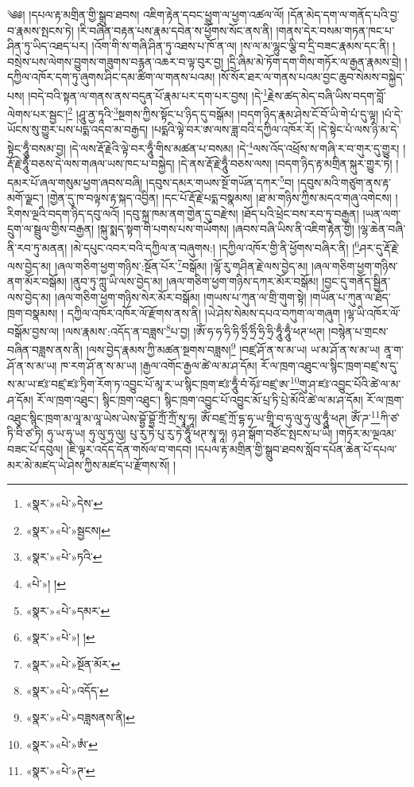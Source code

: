 ༄༅། །དཔལ་རྟ་མགྲིན་གྱི་སྒྲུབ་ཐབས། འཇིག་རྟེན་དབང་ཕྱུག་ལ་ཕྱག་འཚལ་ལོ། །དོན་མེད་དག་ལ་གནོད་པའི་བྱ་བ་རྣམས་སྤངས་ཏེ། །རི་བཞིན་བརྟན་པས་རྣམ་དབེན་ས་ཕྱོགས་སོང་ནས་ནི། །གནས་དེར་བསམ་གཏན་ཁང་པ་ཤིན་ཏུ་ཡིད་འཐད་པར། །འོག་གི་ས་གཞི་ཤིན་ཏུ་འཐས་པ་ཁོ་ན་ལ། །ས་ལ་མ་ལྷུང་ལྕི་བ་དྲི་བཟང་རྣམས་དང་ནི། །བསྲེས་པས་ལེགས་བྱུགས་གཟུགས་བརྙན་འཆར་བ་ལྟ་བུར་བྱ། །དྲི་ཞིམ་མེ་ཏོག་དག་གིས་གཏོར་ལ་རྒྱན་རྣམས་བྲེ། །དཀྱིལ་འཁོར་དག་ཏུ་ཞུགས་ཤིང་དམ་ཚིག་ལ་གནས་པའམ། །སོ་སོར་ཐར་ལ་གནས་པའམ་བྱང་ཆུབ་སེམས་བསྐྱེད་པས། །བདེ་བའི་སྟན་ལ་གནས་ནས་བདུན་པོ་རྣམ་པར་དག་པར་བྱས། །དེ་\footnote{«སྣར་»«པེ་»དེས་}རྗེས་ཚད་མེད་བཞི་ཡིས་བདག་བློ་ལེགས་པར་སྦྱང་།\footnote{«སྣར་»«པེ་»སྦྱངས།} །ཤཱུ་ནྱ་ཏཱའི་\footnote{«སྣར་»«པེ་»ཏའི་}སྔགས་ཀྱིས་སྟོང་པ་ཉིད་དུ་བསྒོམ། །བདག་ཉིད་རྣམ་ཤེས་ངོ་བོ་ཡི་གེ་པཾ་དུ་ལྟ། །པཾ་དེ་ཡོངས་སུ་གྱུར་པས་པདྨ་འདབ་མ་བརྒྱད། །པདྨའི་ལྟེ་བར་ཨ་ལས་ཟླ་བའི་དཀྱིལ་འཁོར་རོ། །དེ་སྟེང་པཾ་ལས་ཉི་མ་དེ་སྟེང་ཧཱུྃ་བསམ་བྱ། །དེ་ལས་རྡོ་རྗེའི་ལྟེ་བར་ཧཱུྃ་གིས་མཚན་པ་བསམ། །དེ་\footnote{«པེ་»། །}ལས་འོད་འཕྲོས་ས་གཞི་ར་བ་གུར་དུ་གྱུར། །རྡོ་རྗེ་ཧཱུྃ་བཅས་དེ་ལས་གཞལ་ཡས་ཁང་པ་བསྐྱེད། །དེ་ནས་རྡོ་རྗེ་ཧཱུྃ་བཅས་ལས། །བདག་ཉིད་རྟ་མགྲིན་སྐུར་གྱུར་ཏེ། །དམར་པོ་ཞལ་གསུམ་ཕྱག་ཞབས་བཞི། །དབུས་དམར་གཡས་སྔོ་གཡོན་དཀར་\footnote{«སྣར་»«པེ་»དམར་}བ། །དབུས་མའི་གཙུག་ནས་རྟ་མགོ་ལྗང་། །གྱེན་དུ་ཁ་བལྟས་རྟ་སྐད་འབྱིན། །དང་པོ་རྡོ་རྗེ་པདྨ་བསྣམས། །ཐ་མ་གཉིས་ཀྱིས་མདའ་གཞུ་འགེངས། །རིགས་ལྔའི་བདག་ཉིད་དབུ་ལའོ། །དབུ་སྐྲ་ཁམ་ནག་གྱེན་དུ་བརྫེས། །ཐོད་པའི་ཕྲེང་བས་རབ་ཏུ་བརྒྱན། །ཡན་ལག་དྲུག་ལ་སྦྲུལ་གྱིས་བརྒྱན། །སྐུ་སྨད་སྟག་གི་པགས་པས་གཡོགས། །ཞབས་བཞི་ཡིས་ནི་འཇིག་རྟེན་གྱི། །ལྷ་ཆེན་བཞི་ནི་རབ་ཏུ་མནན། །མེ་དཔུང་འབར་བའི་དཀྱིལ་ན་བཞུགས:། །དཀྱིལ་འཁོར་གྱི་ནི་ཕྱོགས་བཞིར་ནི། །\footnote{«སྣར་»«པེ་»། །}ཤར་དུ་རྡོ་རྗེ་ལས་བྱེད་མ། །ཞལ་གཅིག་ཕྱག་གཉིས་:སྔོན་པོར་\footnote{«སྣར་»«པེ་»སྔོན་མོར་}བསྒོམ། །ལྷོ་རུ་གཤིན་རྗེ་ལས་བྱེད་མ། །ཞལ་གཅིག་ཕྱག་གཉིས་ནག་མོར་བསྒོམ། །ནུབ་ཏུ་ཀླུ་ཡི་ལས་བྱེད་མ། །ཞལ་གཅིག་ཕྱག་གཉིས་དཀར་མོར་བསྒོམ། །བྱང་དུ་གནོད་སྦྱིན་ལས་བྱེད་མ། །ཞལ་གཅིག་ཕྱག་གཉིས་སེར་མོར་བསྒོམ། །གཡས་པ་ཀུན་ལ་གྲི་གུག་སྟེ། །གཡོན་པ་ཀུན་ལ་ཐོད་ཁྲག་བསྣམས། །
དཀྱིལ་འཁོར་འཁོར་ལོ་རྫོགས་ནས་ནི། །ཡེ་ཤེས་སེམས་དཔའ་བཀུག་ལ་གཞུག །ལྷ་ཡི་འཁོར་ལོ་བསྒོམ་བྱས་ལ། །ལས་རྣམས་:འདོད་ན་བཟླས་\footnote{«སྣར་»«པེ་»འདོད་}པ་བྱ། །ཨོཾ་ཧ་ཧ་ཧི་ཧི་ཧྲིཾ་ཧྲིཾ་ཧྲི་ཧྲི་ཧཱུྃ་ཧཱུྃ་ཕཊ་ཕཊ། །བསྙེན་པ་གྲངས་བཞིན་བཟླས་ནས་ནི། །ལས་བྱེད་རྣམས་ཀྱི་མཚན་སྔགས་བཟླས།\footnote{«སྣར་»«པེ་»བཟླསནས་ནི།} །བཛྲ་ཤོ་ན་ས་མ་ཡ། ཡ་མ་ཤོ་ན་ས་མ་ཡ། ནཱ་ག་ཤོ་ན་ས་མ་ཡ། ཁ་རག་ཤོ་ན་ས་མ་ཡ། །རྒྱལ་འགོང་རྒྱལ་ཚེ་ལ་མ་ཤ་དོམ། རོ་ལ་ཁྲག་འཐུང་ལ་སྙིང་ཁྲག་བཛྲ་ས་དུ་ས་མ་ཡ་ཛཿ་བཛྲ་ཛཿ་ཏྲིག་རོག་ཏ་འབྱུང་པོ་མཱ་ར་ཡ་སྙིང་ཁྲག་ཛཿ་ཧཱུྃ་བཾ་ཧོཿ་བཛྲ་ཨ་\footnote{«སྣར་»«པེ་»ཨཾ་}གུ་ཤ་ཛཿ་འབྱུང་པོའི་ཚེ་ལ་མ་ཤ་དོམ། རོ་ལ་ཁྲག་འཐུང་། སྙིང་ཁྲག་འཐུང་། སྙིང་ཁྲག་འབྱུང་པོ་འབྱུང་མོ་པྲ་ཏི་པྲེ་མོའི་ཚེ་ལ་མ་ཤ་དོམ། རོ་ལ་ཁྲག་འཐུང་སྙིང་ཁྲག་མ་ལཱ་མ་ལཱ་ཡེས་ཡེས་བྷྱོ་བྷྱོ་ཀྲོཾ་ཀྲོཾ་སྭཱ་ཧཱ། ཨོཾ་བཛྲ་ཀྲོ་དྷ་ཧ་ཡ་གྲཱི་བ་ཧུ་ལུ་ཧུ་ལུ་ཧཱུྃ་ཕཊ། ཨོཾ་ཌ་\footnote{«སྣར་»«པེ་»ཊ་}ཀི་ཙ་ཏི་བི་ཙ་ཏི། ཧུ་ཡ་ཧུ་ཡ། ཧུ་ལུ་ཧུ་ལུ། པུ་རུ་ཏེ་པུ་རུ་ཏེ་ཧཱུྃ་ཕཊ་སྭཱ་ཧཱ། ཉ་ཤ་སྒོག་བཙོང་སྤངས་པ་ཡི། །གཏོར་མ་ལྔའམ་བཟང་པོ་དབུལ། །ཇི་ལྟར་འདོད་དོན་གསོལ་བ་གདབ། །དཔལ་རྟ་མགྲིན་གྱི་སྒྲུབ་ཐབས་སློབ་དཔོན་ཆེན་པོ་དཔལ་མར་མེ་མཛད་ཡེ་ཤེས་ཀྱིས་མཛད་པ་རྫོགས་སོ། ། 
